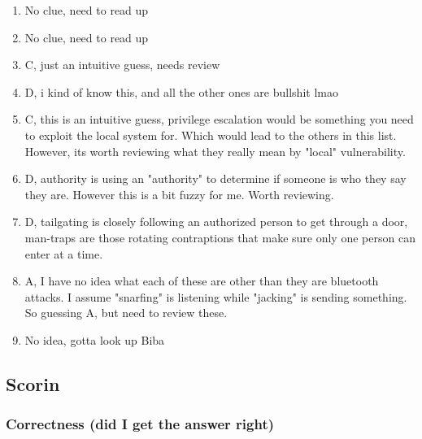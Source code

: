 \documentclass[11pt]{article}
\begin{document}
\begin{enumerate}
\item No clue, need to read up
\item No clue, need to read up
\item C, just an intuitive guess, needs review
\item D, i kind of know this, and all the other ones are bullshit lmao
\item C, this is an intuitive guess, privilege escalation would be something you need to exploit the local system for. Which would lead to the others in this list. However, its worth reviewing what they really mean by "local" vulnerability.
\item D, authority is using an "authority" to determine if someone is who they say they are. However this is a bit fuzzy for me. Worth reviewing.
\item D, tailgating is closely following an authorized person to get through a door, man-traps are those rotating contraptions that make sure only one person can enter at a time.
\item A, I have no idea what each of these are other than they are bluetooth attacks. I assume "snarfing" is listening while "jacking" is sending something. So guessing A, but need to review these.
\item No idea, gotta look up Biba
\end{enumerate}
\subsection{Scorin}
\label{sec:orgc82a734}

\subsubsection{Correctness (did I get the answer right)}
\label{sec:orgdfc0e48}
\end{document}

